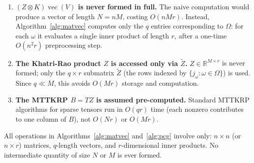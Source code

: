 \documentclass[12pt]{article}
\theoremstyle{definition}
\DeclareMathOperator{\vecop}{vec}
\begin{document}
\begin{enumerate}[label=(\roman*)]
  \item \textbf{$(Z \otimes K)\vecop(V)$ is never formed in full.}
        The naive computation would produce a vector of length $N = nM$, costing $O(nMr)$.
        Instead, Algorithm~\ref{alg:matvec} computes only the $q$ entries corresponding
        to $\Omega$: for each $\omega$ it evaluates a single inner product of length $r$,
        after a one-time $O(n^2 r)$ preprocessing step.

  \item \textbf{The Khatri-Rao product $Z$ is accessed only via $\widetilde{Z}$.}
        $Z \in \mathbb{R}^{M \times r}$ is never formed; only the $q \times r$ submatrix
        $\widetilde{Z}$ (the rows indexed by $\{j_\omega : \omega \in \Omega\}$) is used.
        Since $q \ll M$, this avoids $O(Mr)$ storage and computation.

  \item \textbf{The MTTKRP $B = TZ$ is assumed pre-computed.}
        Standard MTTKRP algorithms for sparse tensors run in $O(qr)$ time (each nonzero
        contributes to one column of $B$), not $O(Nr)$ or $O(Mr)$.
\end{enumerate}

All operations in Algorithms~\ref{alg:matvec} and~\ref{alg:pcg} involve only:
$n \times n$ (or $n \times r$) matrices, $q$-length vectors, and $r$-dimensional inner products.
No intermediate quantity of size $N$ or $M$ is ever formed.
\end{document}
